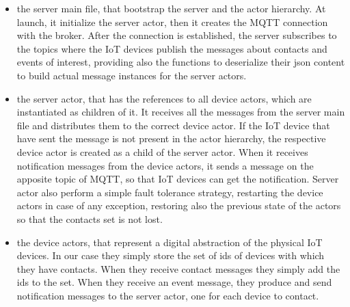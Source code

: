 \documentclass[10pt]{article}
\begin{document}
	\begin{itemize}
		\item the server main file, that bootstrap the server and the actor hierarchy. At launch, it initialize the server actor, then it creates the MQTT connection with the broker. After the connection is established, the server subscribes to the topics where the IoT devices publish the messages about contacts and events of interest, providing also the functions to deserialize their json content to build actual message instances for the server actors.
		\item the server actor, that has the references to all device actors, which are instantiated as children of it. It receives all the messages from the server main file and distributes them to the correct device actor. If the IoT device that have sent the message is not present in the actor hierarchy, the respective device actor is created as a child of the server actor. When it receives notification messages from the device actors, it sends a message on the apposite topic of MQTT, so that IoT devices can get the notification. Server actor also perform a simple fault tolerance strategy, restarting the device actors in case of any exception, restoring also the previous state of the actors so that the contacts set is not lost.
		\item the device actors, that represent a digital abstraction of the physical IoT devices. In our case they simply store the set of ids of devices with which they have contacts. When they receive contact messages they simply add the ids to the set. When they receive an event message, they produce and send notification messages to the server actor, one for each device to contact.
	\end{itemize}      
	
	
	
\end{document}
